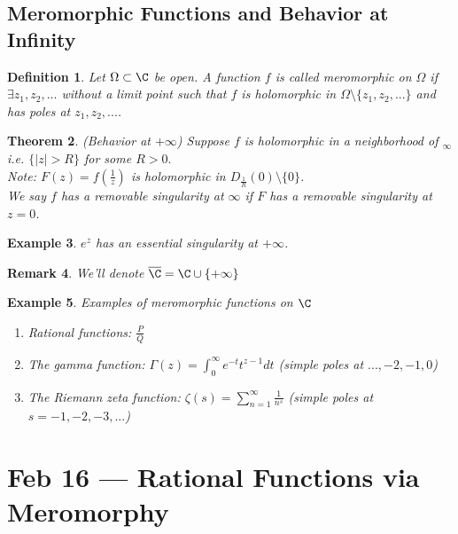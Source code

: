 \documentclass[a4paper]{article}
\newtheorem{thm}{Theorem}[section]
\newtheorem{defn}[thm]{Definition}
\newtheorem{eg}[thm]{Example}
\newtheorem{rmk}[thm]{Remark}
\begin{document}
\subsection{Meromorphic Functions and Behavior at Infinity}
\begin{defn}
    Let $\Omega\subset \C$ be open. A function $f$ is called meromorphic on $\Omega$ if $\exists z_1,z_2,...$ without a limit point such that $f$ is holomorphic in $\Omega\setminus \{z_1,z_2,...\}$ and has poles at $z_1,z_2,...$. 
\end{defn}
\begin{thm}
    (Behavior at $+\infty$) Suppose $f$ is holomorphic in a neighborhood of $_\infty$ i.e. $ \{|z|>R\}$ for some $R>0.$ \\
    Note: $F(z)=f(\frac{1}{z})$ is holomorphic in $D_{ \frac{1}{R}}(0)\setminus \{0\}$. \\
    We say $f$ has a removable singularity at $\infty$ if $F$ has a removable singularity at $z=0$. 
\end{thm}
\begin{eg}
    $e^z$ has an essential singularity at $+\infty$. 
\end{eg}
\begin{rmk}
    We'll denote $\overline{\C}=\C \cup \{+\infty\}$
\end{rmk}
\begin{eg}
    Examples of meromorphic functions on $\C$
    \begin{enumerate}
        \item Rational functions: $\frac{P}{Q}$
        \item The gamma function: $\Gamma(z)=\int_0^\infty e^{-t}t^{z-1}dt$ (simple poles at $...,-2,-1,0$)
        \item The Riemann zeta function: $\zeta(s)=\sum_{n=1}^\infty \frac{1}{n^s}$ (simple poles at $s=-1,-2,-3,...$)
    \end{enumerate}
\end{eg}
\newpage
\section{Feb 16 --- Rational Functions via Meromorphy}
\end{document}
